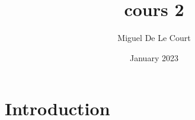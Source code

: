 \documentclass{article}
\title{cours 2}
\author{Miguel De Le Court}
\date{January 2023}
\begin{document}
\maketitle

\section{Introduction}
\end{document}
